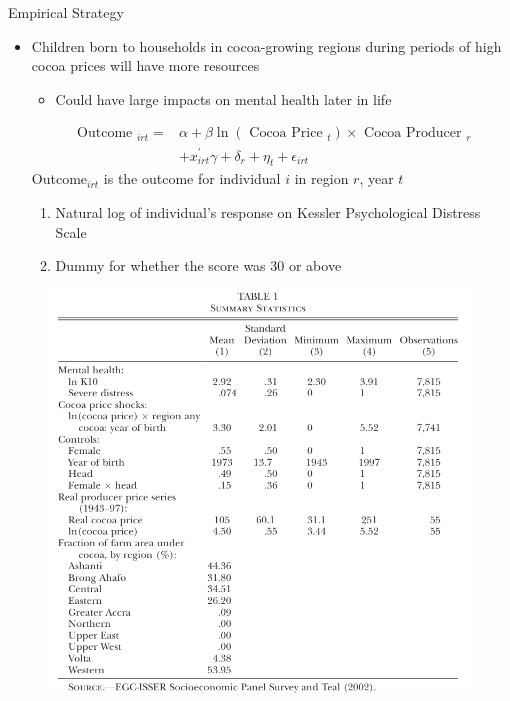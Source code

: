 \documentclass[dvipsnames]{beamer}
\begin{document}
    \begin{frame}{Empirical Strategy}
      \begin{itemize}
      \item Children born to households in cocoa-growing regions during periods of high cocoa prices will have more resources
        \begin{itemize}
        \item Could have large impacts on mental health later in life
        \end{itemize}
        \vfill
        \[
\begin{aligned}
\text { Outcome }_{i r t}=& \alpha+\beta \ln \left(\text { Cocoa Price }_{t}\right) \times \text { Cocoa Producer }_{r} \\
&+x_{i r t}^{\prime} \gamma+\delta_{r}+\eta_{t}+\epsilon_{i r t}
\end{aligned}
        \]
        \vitem Outcome$_{irt}$ is the outcome for individual $i$ in region $r$, year $t$
        \begin{enumerate}
        \item Natural log of individual's response on Kessler Psychological Distress Scale
          \item Dummy for whether the score was 30 or above
        \end{enumerate}
      \end{itemize}
    \end{frame}
    \begin{frame}{}
      \begin{figure}[htp]
        \centering
      \includegraphics[height=\textheight, keepaspectratio=true]{tab1.png}  
      \end{figure}
    \end{frame}
\end{document}
